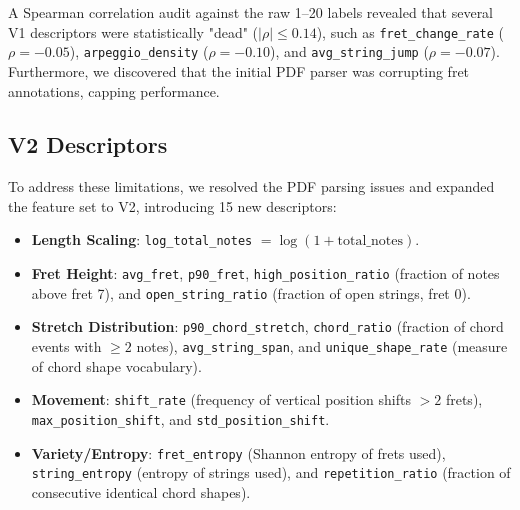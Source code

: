 A Spearman correlation audit against the raw 1–20 labels revealed that several V1 descriptors were statistically "dead" ($|\rho| \le 0.14$), such as \texttt{fret\_change\_rate} ($\rho = -0.05$), \texttt{arpeggio\_density} ($\rho = -0.10$), and \texttt{avg\_string\_jump} ($\rho = -0.07$). Furthermore, we discovered that the initial PDF parser was corrupting fret annotations, capping performance.

\subsection{V2 Descriptors}
To address these limitations, we resolved the PDF parsing issues and expanded the feature set to V2, introducing 15 new descriptors:
\begin{itemize}
    \item \textbf{Length Scaling}: \texttt{log\_total\_notes} $= \log(1 + \text{total\_notes})$.
    \item \textbf{Fret Height}: \texttt{avg\_fret}, \texttt{p90\_fret}, \texttt{high\_position\_ratio} (fraction of notes above fret 7), and \texttt{open\_string\_ratio} (fraction of open strings, fret 0).
    \item \textbf{Stretch Distribution}: \texttt{p90\_chord\_stretch}, \texttt{chord\_ratio} (fraction of chord events with $\ge 2$ notes), \texttt{avg\_string\_span}, and \texttt{unique\_shape\_rate} (measure of chord shape vocabulary).
    \item \textbf{Movement}: \texttt{shift\_rate} (frequency of vertical position shifts $> 2$ frets), \texttt{max\_position\_shift}, and \texttt{std\_position\_shift}.
    \item \textbf{Variety/Entropy}: \texttt{fret\_entropy} (Shannon entropy of frets used), \texttt{string\_entropy} (entropy of strings used), and \texttt{repetition\_ratio} (fraction of consecutive identical chord shapes).
\end{itemize}

